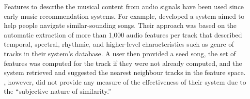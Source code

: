 

Features to describe the musical content from audio signals have been used since early music recommendation systems. For example, \textcite{welsh00querying} developed a system aimed to help people navigate similar-sounding songs. Their approach was based on the automatic extraction of more than 1,000 audio features per track that described temporal, spectral, rhythmic, and higher-level characteristics such as genre of tracks in their system's data\-base.
A user then provided a seed song, the set of features was computed for the track if they were not already computed, and the system retrieved and suggested the nearest neighbour tracks in the feature space.
\citeauthor{welsh00querying}, however, did not provide any measure of the effectiveness of their system due to the ``subjective nature of similarity.'' 

